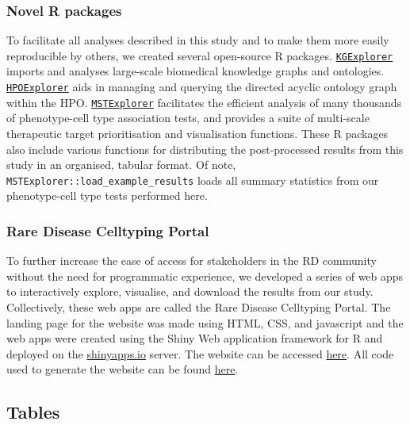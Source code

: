 \documentclass[
]{agujournal2019}
\begin{document}
\subsubsection{Novel R packages}\label{novel-r-packages}

To facilitate all analyses described in this study and to make them more
easily reproducible by others, we created several open-source R
packages.
\href{https://github.com/neurogenomics/KGExplorer}{\texttt{KGExplorer}}
imports and analyses large-scale biomedical knowledge graphs and
ontologies.
\href{https://github.com/neurogenomics/HPOExplorer}{\texttt{HPOExplorer}}
aids in managing and querying the directed acyclic ontology graph within
the HPO.
\href{https://github.com/neurogenomics/MSTExplorer}{\texttt{MSTExplorer}}
facilitates the efficient analysis of many thousands of phenotype-cell
type association tests, and provides a suite of multi-scale therapeutic
target prioritisation and visualisation functions. These R packages also
include various functions for distributing the post-processed results
from this study in an organised, tabular format. Of note,
\texttt{MSTExplorer::load\_example\_results} loads all summary
statistics from our phenotype-cell type tests performed here.

\subsubsection{Rare Disease Celltyping
Portal}\label{rare-disease-celltyping-portal}

To further increase the ease of access for stakeholders in the RD
community without the need for programmatic experience, we developed a
series of web apps to interactively explore, visualise, and download the
results from our study. Collectively, these web apps are called the Rare
Disease Celltyping Portal. The landing page for the website was made
using HTML, CSS, and javascript and the web apps were created using the
Shiny Web application framework for R and deployed on the
\href{https://www.shinyapps.io}{shinyapps.io} server. The website can be
accessed
\href{https://neurogenomics.github.io/rare_disease_celltyping_apps/home}{here}.
All code used to generate the website can be found
\href{https://github.com/neurogenomics/rare_disease_celltyping_apps}{here}.

\newpage{}

\subsection{Tables}\label{tables}
\end{document}
